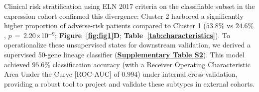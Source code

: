 \documentclass[11pt,a4paper]{article}
\newcommand{\pval}[1]{$p$\,$=$\,#1}
\begin{document}
Clinical risk stratification using ELN 2017 criteria \cite{dohner2017eln} on the classifiable subset in the expression cohort confirmed this divergence: Cluster 2 harbored a significantly higher proportion of adverse-risk patients compared to Cluster 1 ($53.8\%$ vs $24.6\%$, \pval{2.20$\times$10$^{-9}$}; \textbf{Figure~\ref{fig:fig1}D}; \textbf{Table~\ref{tab:characteristics}}). To operationalize these unsupervised states for downstream validation, we derived a supervised 50-gene lineage classifier (\href{Supplementary_Methods.pdf#tab:tabS2}{\textbf{Supplementary Table S2}}). This model achieved $95.6\%$ classification accuracy (with a Receiver Operating Characteristic Area Under the Curve [ROC-AUC] of $0.994$) under internal cross-validation, providing a robust tool to project and validate these subtypes in external cohorts.
\end{document}
